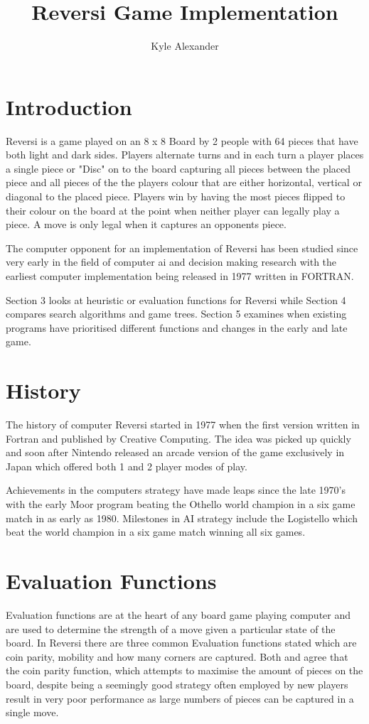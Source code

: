 \documentclass[review]{cmpreport}
\title{Reversi Game Implementation}
\author{Kyle Alexander}
\begin{document}
\section{Introduction}
Reversi is a game played on an 8 x 8 Board by 2 people with 64 pieces that have both light and dark sides. Players alternate turns and in each turn a player places a single piece or "Disc" on to the board capturing all pieces between the placed piece and all pieces of the the players colour that are either horizontal, vertical or diagonal to the placed piece. Players win by having the most pieces flipped to their colour on the board at the point when neither player can legally play a piece. A move is only legal when it captures an opponents piece. 

The computer opponent for an implementation of Reversi has been studied since very early in the field of computer ai and decision making research with the earliest computer implementation being released in 1977 \citep{Othello23:online} \label{early} written in FORTRAN. 

Section 3 looks at heuristic or evaluation functions for Reversi while Section 4 compares search algorithms and game trees. Section 5 examines when existing programs have prioritised different functions and changes in the early and late game.

\section{History}
The history of computer Reversi started in 1977 when the first version written in Fortran and published by Creative Computing. The idea was picked up quickly and soon after Nintendo released an arcade version of the game exclusively in Japan  \citep{picard2013foundation} which offered both 1 and 2 player modes of play. 

Achievements in the computers strategy have made leaps since the late 1970's with the early Moor program beating the Othello world champion in a six game match in as early as 1980. Milestones in AI strategy include the Logistello which beat the world champion in a six game match winning all six games.

\section{Evaluation Functions}
Evaluation functions are at the heart of any board game playing computer and are used to determine the strength of a move given a particular state of the board. In Reversi there are three common Evaluation functions stated which are coin parity, mobility and how many corners are captured. Both  \citet{clune2007heuristic} and \citet{sannidhanam2015analysis} agree that the coin parity function, which attempts to maximise the amount of pieces on the board, despite being a seemingly good strategy often employed by new players result in very poor performance as large numbers of pieces can be captured in a single move.
	
\end{document}
